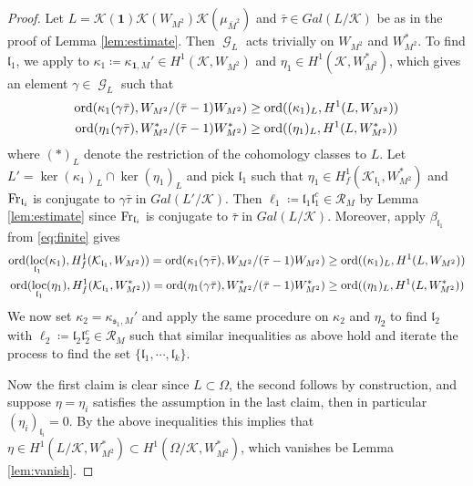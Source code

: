\documentclass[leqno]{amsart}
\theoremstyle{definition}
\theoremstyle{remark}
\newcommand{\id}{\mathbf{1}}
\DeclareMathOperator{\Gal}{\mathcal{G}}
\newcommand{\Fr}{\textnormal{Fr}} %
\newcommand{\fl}{\mathfrak{l}}
\newcommand{\fs}{\mathfrak{s}}
\newcommand{\K}{{\mathcal{K}}} %
\newcommand{\ord}{\textnormal{ord}} %
\DeclareMathOperator{\loc}{loc}
\begin{document}
\begin{proof}
Let $L=\K(\id)\K(W_{M^2})\K(\mu_{\bar{M}^2})$
and $\bar{\tau}\in Gal(L/\K)$ be as in the proof of Lemma \ref{lem:estimate}.
Then $\Gal_L$ acts trivially on $W_{M^2}$ and $W_{M^2}^*$.
To find $\fl_1$, we apply \cite[Lem 5.2.1]{Rubin}
to $\kappa_1\coloneqq \kappa_{\id,M}'\in H^1(\K,W_{M^2})$ and
$\eta_{1}\in H^1(\K,W_{M^2}^*)$, which gives 
an element $\gamma\in \Gal_L$ such that 
\begin{align*}
	\ord(\kappa_1(\gamma\bar{\tau}),W_{M^2}/(\bar{\tau}-1)W_{M^2})&\geq
	\ord( (\kappa_1)_L, H^1(L,W_{M^2}) )\\
	\ord(\eta_1(\gamma\bar{\tau}),W_{M^2}^*/(\bar{\tau}-1)W_{M^2}^*)&\geq
	\ord( (\eta_1)_L, H^1(L,W_{M^2}^*) ) 
\end{align*}
where $(*)_L$ denote the restriction of the cohomology classes to $L$.
Let $L'=\ker(\kappa_1)_L\cap \ker(\eta_1)_L$
and pick $\fl_1$ such that 
$\eta_1\in H^1_f(\K_{\fl_1}, W_{M^2}^*)$ and
$\Fr_{\fl_i}$ is conjugate to 
$\gamma\bar{\tau}$ in $Gal(L'/\K)$.
Then $\ell_1\coloneqq \fl_1\fl_1^c\in \mathcal{R}_M$ 
by Lemma \ref{lem:estimate} since
$\Fr_{\fl_i}$ is conjugate to  $\bar{\tau}$ in $Gal(L/\K)$.
Moreover, apply $\beta_{\fl_1}$ from \eqref{eq:finite} gives
\begin{align*}
	\ord( \loc_{\fl_1}(\kappa_1), H^1_f(\K_{\fl_1},W_{M^2}))=
	\ord(\kappa_1(\gamma\bar{\tau}),W_{M^2}/(\bar{\tau}-1)W_{M^2})&\geq
	\ord( (\kappa_1)_L, H^1(L,W_{M^2}) )\\
	\ord( \loc_{\fl_1}(\eta_1), H^1_f(\K_{\fl_1},W_{M^2}^*))=
	\ord(\eta_1(\gamma\bar{\tau}),W_{M^2}^*/(\bar{\tau}-1)W_{M^2}^*)&\geq
	\ord( (\eta_1)_L, H^1(L,W_{M^2}^*) ) 
\end{align*}
We now set $\kappa_2=\kappa_{\fs_1,M}'$
and apply the same procedure on $\kappa_2$ and $\eta_2$
to find $\fl_2$ with
$\ell_2\coloneqq \fl_2\fl_2^c\in \mathcal{R}_M$ 
such that similar inequalities as above hold
and iterate the process to find 
the set $\{\fl_1,\cdots,\fl_k\}$.

Now the first claim is clear since $L\subset \Omega$,
the second follows by construction,
and suppose $\eta=\eta_i$ satisfies
the assumption in the last claim,
then in particular $(\eta_i)_{\fl_i}=0$.
By the above inequalities this implies that
$\eta\in H^1(L/\K, W_{M^2}^*)\subset H^1(\Omega/\K, W_{M^2}^*)$,
which vanishes be Lemma \ref{lem:vanish}.

\end{proof}
\end{document}
